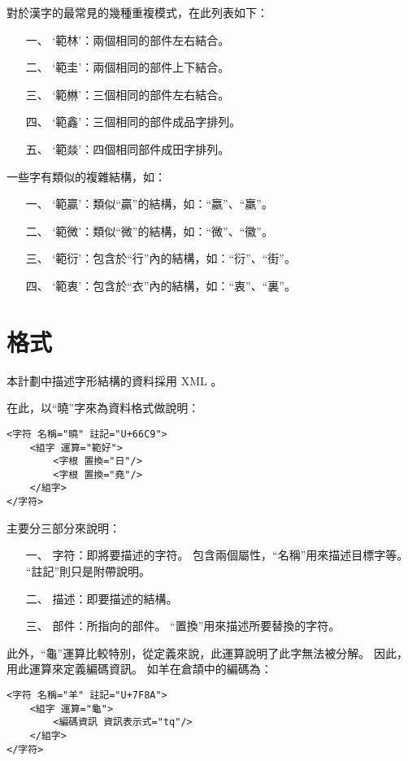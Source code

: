 對於漢字的最常見的幾種重複模式，在此列表如下：
\begin{enumerate}
\item[一、]`範林'：兩個相同的部件左右結合。
\item[二、]`範圭'：兩個相同的部件上下結合。
\item[三、]`範㴇'：三個相同的部件左右結合。
\item[四、]`範鑫'：三個相同的部件成品字排列。
\item[五、]`範燚'：四個相同部件成田字排列。
\end{enumerate}

一些字有類似的複雜結構，如：
\begin{enumerate}
\item[一、]`範贏'：類似``贏''的結構，如：``嬴''、``羸''。
\item[二、]`範微'：類似``微''的結構，如：``微''、``徽''。
\item[三、]`範衍'：包含於``行''內的結構，如：``衍''、``街''。
\item[四、]`範衷'：包含於``衣''內的結構，如：``衷''、``裏''。
\end{enumerate}


\section{格式}
本計劃中描述字形結構的資料採用 XML 。

在此，以``曉''字來為資料格式做說明：
\listXML\begin{lstlisting}
<字符 名稱="曉" 註記="U+66C9">
	<組字 運算="範好">
		<字根 置換="日"/>
		<字根 置換="堯"/>
	</組字>
</字符>
\end{lstlisting}

主要分三部分來說明：
\begin{enumerate}
\item[一、]字符：即將要描述的字符。
包含兩個屬性，``名稱''用來描述目標字等。
``註記''則只是附帶說明。
\item[二、]描述：即要描述的結構。
\item[三、]部件：所指向的部件。
``置換''用來描述所要替換的字符。
\end{enumerate}



此外，``龜''運算比較特別，從定義來說，此運算說明了此字無法被分解。
因此，用此運算來定義編碼資訊。
如羊在倉頡中的編碼為：
\listXML\begin{lstlisting}
<字符 名稱="羊" 註記="U+7F8A">
	<組字 運算="龜">
		<編碼資訊 資訊表示式="tq"/>
	</組字>
</字符>
\end{lstlisting}

